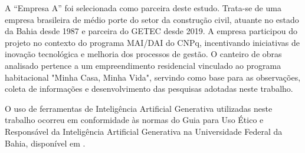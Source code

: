 A “Empresa A” foi selecionada como parceira deste estudo. Trata-se de uma empresa brasileira de médio porte do setor da construção civil, atuante no estado da Bahia desde 1987 e parceira do GETEC desde 2019. A empresa participou do projeto no contexto do programa MAI/DAI do CNPq, incentivando iniciativas de inovação tecnológica e melhoria dos processos de gestão. O canteiro de obras analisado pertence a um empreendimento residencial vinculado ao programa habitacional "Minha Casa, Minha Vida", servindo como base para as observações, coleta de informações e desenvolvimento das pesquisas adotadas neste trabalho.

O uso de ferramentas de Inteligência Artificial Generativa utilizadas neste trabalho ocorreu em conformidade às normas do Guia para Uso Ético e
Responsável da Inteligência Artificial Generativa na
Universidade Federal da Bahia, disponível em \cite{ufba2025ia}.

